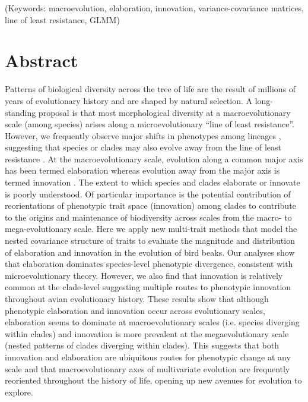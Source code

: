 \documentclass[12pt,letterpaper]{article}
\begin{document}
\noindent (Keywords: macroevolution, elaboration, innovation, variance-covariance matrices, line of least resistance, GLMM)\\

\section{Abstract}

Patterns of biological diversity across the tree of life are the result of millions of years of evolutionary history and are shaped by natural selection.
A long-standing proposal is that most morphological diversity at a macroevolutionary scale (among species) arises along a microevolutionary ``line of least resistance''.
However, we frequently observe major shifts in phenotypes among lineages \cite{venditti2011multiple, pagel2022general, BurinWhales}, suggesting that species or clades may also evolve away from the line of least resistance \cite{renaud2006conserved}.
At the macroevolutionary scale, evolution along a common major axis has been termed elaboration whereas evolution away from the major axis is termed innovation \cite{endler2005animal}. 
The extent to which species and clades elaborate or innovate is poorly understood.
Of particular importance is the potential contribution of reorientations of phenotypic trait space (innovation) among clades to contribute to the origins and maintenance of biodiversity across scales from the macro- to mega-evolutionary scale.
Here we apply new multi-trait methods that model the nested covariance structure of traits to evaluate the magnitude and distribution of elaboration and innovation in the evolution of bird beaks.
Our analyses show that elaboration dominates species-level phenotypic divergence, consistent with microevolutionary theory.
However, we also find that innovation is relatively common at the clade-level suggesting multiple routes to phenotypic innovation throughout avian evolutionary history.
These results show that although phenotypic elaboration and innovation occur across evolutionary scales, elaboration seems to dominate at macroevolutionary scales (i.e. species diverging within clades) and innovation is more prevalent at the megaevolutionary scale (nested patterns of clades diverging within clades).
This suggests that both innovation and elaboration are ubiquitous routes for phenotypic change at any scale and that macroevolutionary axes of multivariate evolution are frequently reoriented throughout the history of life, opening up new avenues for evolution to explore.
\end{document}
